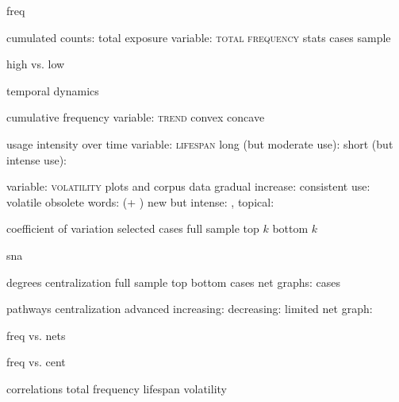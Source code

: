 
freq

  cumulated counts: total exposure
    variable: \textsc{total frequency}
    stats
      cases
      sample

    high vs. low

  temporal dynamics

    cumulative frequency
      variable: \textsc{trend}
        convex
        concave

    usage intensity over time
      variable: \textsc{lifespan}
        long (but moderate use): 
        short (but intense use): 

      variable: \textsc{volatility}
        plots and corpus data
          gradual increase: 
          consistent use: 
          volatile
            obsolete words:  (+ )
            new but intense: , 
            topical: 

        coefficient of variation
          selected cases
          full sample
            top $k$
            bottom $k$

sna

  degrees
    centralization
      full sample
        top
        bottom
      cases
    net graphs: cases

  pathways
    centralization
      advanced
      increasing:
      decreasing:
      limited
    net graph: 

freq vs. nets

  freq vs. cent

  correlations
    total frequency
    lifespan
    volatility
